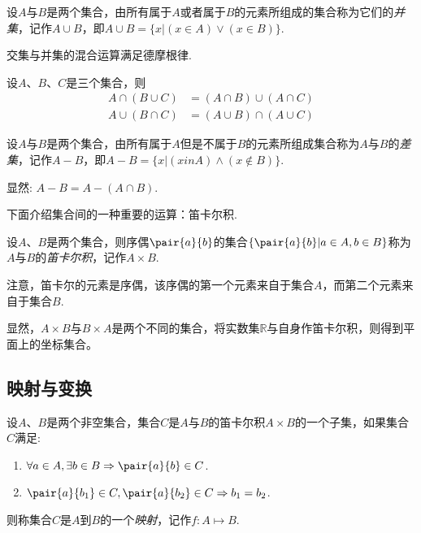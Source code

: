 \begin{definition}
  设$A$与$B$是两个集合，由所有属于$A$或者属于$B$的元素所组成的集合称为它们的\emph{并集}，记作$A \cup B$，即$A \cup B = \{x | (x \in A) \lor (x \in B) \}$.
\end{definition}

交集与并集的混合运算满足德摩根律.
\begin{theorem}
  设$A$、$B$、$C$是三个集合，则
  \begin{align*}
    A \cap (B \cup C) & = (A \cap B) \cup (A \cap C) \\
    A \cup (B \cap C) & = (A \cup B) \cap (A \cup C) 
  \end{align*}
\end{theorem}

\begin{definition}
  设$A$与$B$是两个集合，由所有属于$A$但是不属于$B$的元素所组成集合称为$A$与$B$的\emph{差集}，记作$A-B$，即$A-B = \{x | (x in A) \land (x \notin B) \}$.
\end{definition}

显然: $A-B = A - (A \cap B)$.

下面介绍集合间的一种重要的运算：笛卡尔积.
\begin{definition}
  设$A$、$B$是两个集合，则序偶$\pair{a}{b}$的集合$\{ \pair{a}{b} | a \in A, b \in B \}$称为$A$与$B$的\emph{笛卡尔积}，记作$A \times B$.
\end{definition}

注意，笛卡尔的元素是序偶，该序偶的第一个元素来自于集合$A$，而第二个元素来自于集合$B$.

显然，$A \times B$与$B \times A$是两个不同的集合，将实数集$\mathbb{R}$与自身作笛卡尔积，则得到平面上的坐标集合。

\subsection{映射与变换}
\label{sec:map-and-translation}

\begin{definition}
  设$A$、$B$是两个非空集合，集合$C$是$A$与$B$的笛卡尔积$A \times B$的一个子集，如果集合$C$满足:
  \begin{enumerate}
  \item $\forall a \in A, \exists  b \in B \Rightarrow \pair{a}{b} \in C$.
  \item $ \pair{a}{b_1} \in C, \pair{a}{b_2} \in C \Rightarrow b_1=b_2$.
  \end{enumerate}
  则称集合$C$是$A$到$B$的一个\emph{映射}，记作$f:A \mapsto B$.
\end{definition}

